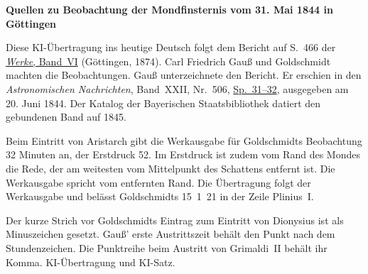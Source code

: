 \clearpage\thispagestyle{empty}
\begin{center}\textbf{Quellen zu Beobachtung der Mondfinsternis vom 31. Mai 1844 in Göttingen}\end{center}
\noindent Diese KI-Übertragung ins heutige Deutsch folgt dem Bericht auf S.~466 der \href{https://gdz.sub.uni-goettingen.de/id/PPN236007467}{\textit{Werke}, Band~VI} (Göttingen, 1874). Carl Friedrich Gauß und Goldschmidt machten die Beobachtungen. Gauß unterzeichnete den Bericht. Er erschien in den \textit{Astronomischen Nachrichten}, Band~XXII, Nr.~506, \href{https://api.digitale-sammlungen.de/iiif/image/v2/bsb10049447_00024/full/1800,/0/default.jpg}{Sp.~31--32}, ausgegeben am 20. Juni 1844. Der Katalog der Bayerischen Staatsbibliothek datiert den gebundenen Band auf 1845.
\par\smallskip\noindent Beim Eintritt von Aristarch gibt die Werkausgabe für Goldschmidts Beobachtung 32 Minuten an, der Erstdruck 52. Im Erstdruck ist zudem vom Rand des Mondes die Rede, der am weitesten vom Mittelpunkt des Schattens entfernt ist. Die Werkausgabe spricht vom entfernten Rand. Die Übertragung folgt der Werkausgabe und belässt Goldschmidts 15~1~21 in der Zeile Plinius~I.
\par\smallskip\noindent Der kurze Strich vor Goldschmidts Eintrag zum Eintritt von Dionysius ist als Minuszeichen gesetzt. Gauß’ erste Austrittszeit behält den Punkt nach dem Stundenzeichen. Die Punktreihe beim Austritt von Grimaldi~II behält ihr Komma. KI-Übertragung und KI-Satz.
\clearpage
